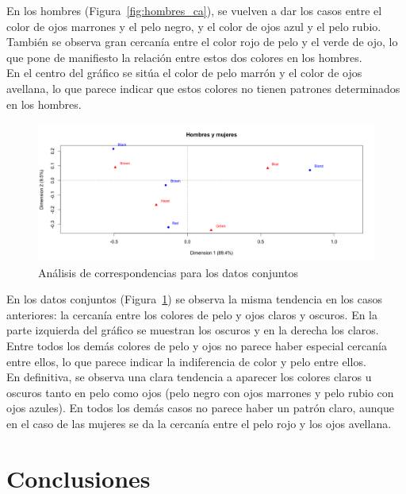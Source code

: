 \documentclass[12pt,a4paper,twoside,openright,titlepage,final]{article}
\begin{document}
En los hombres (Figura~\ref{fig:hombres_ca}), se vuelven a dar los casos entre el color de ojos marrones y el pelo negro, y el color de ojos azul y  el pelo rubio. También se observa gran cercanía entre el color rojo de pelo y el verde de ojo, lo que pone de manifiesto la relación entre estos dos colores en los hombres.\\

En el centro del gráfico se sitúa el color de pelo marrón y el color de ojos avellana, lo que parece indicar que estos colores no tienen patrones determinados en los hombres.\\ 

\begin{figure}[tbph!]
\centering
\includegraphics[width=\linewidth]{imagenes/global_ca}
\caption{Análisis de correspondencias para los datos conjuntos}
\label{fig:global_ca}
\end{figure}

En los datos conjuntos (Figura~\ref{fig:global_ca}) se observa la misma tendencia en los casos anteriores: la cercanía entre los colores de pelo y ojos claros y oscuros. En la parte izquierda del gráfico se muestran los oscuros y en la derecha los claros. Entre todos los demás colores de pelo y ojos no parece haber especial cercanía entre ellos, lo que parece indicar la indiferencia de color y pelo entre ellos.\\

En definitiva, se observa una clara tendencia a aparecer los colores claros u oscuros tanto en pelo como ojos (pelo negro con ojos marrones y pelo rubio con ojos azules). En todos los demás casos no parece haber un patrón claro, aunque en el caso de las mujeres se da la cercanía entre el pelo rojo y los ojos avellana. 

\section{Conclusiones}
\end{document}
